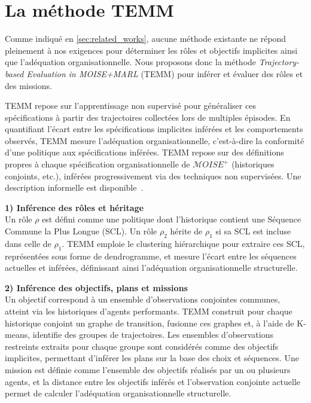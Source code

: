 \documentclass[dissemination]{jfsma}
\begin{document}
\section{La méthode TEMM}
\label{sec:TEMM_algorithm}

Comme indiqué en \autoref{sec:related_works}, aucune méthode existante ne répond pleinement à nos exigences pour déterminer les rôles et objectifs implicites ainsi que l'adéquation organisationnelle. Nous proposons donc la méthode \textit{Trajectory-based Evaluation in MOISE+MARL} (TEMM) pour inférer et évaluer des rôles et des missions.

TEMM repose sur l'apprentissage non supervisé pour généraliser ces spécifications à partir des trajectoires collectées lors de multiples épisodes. En quantifiant l'écart entre les spécifications implicites inférées et les comportements observés, TEMM mesure l'adéquation organisationnelle, c'est-à-dire la conformité d'une politique aux spécifications inférées. TEMM repose sur des définitions propres à chaque spécification organisationnelle de \(\mathcal{M}OISE^+\) (historiques conjoints, etc.), inférées progressivement via des techniques non supervisées. Une description informelle est disponible~\hyperref[fn:github]{\footnotemark[1]}.


\noindent\textbf{1) Inférence des rôles et héritage} \\
Un rôle \(\rho\) est défini comme une politique dont l'historique contient une Séquence Commune la Plus Longue (SCL). Un rôle \(\rho_2\) hérite de \(\rho_1\) si sa SCL est incluse dans celle de \(\rho_1\). TEMM emploie le clustering hiérarchique pour extraire ces SCL, représentées sous forme de dendrogramme, et mesure l'écart entre les séquences actuelles et inférées, définissant ainsi l'adéquation organisationnelle structurelle.

\noindent\textbf{2) Inférence des objectifs, plans et missions} \\
Un objectif correspond à un ensemble d'observations conjointes communes, atteint via les historiques d'agents performants. TEMM construit pour chaque historique conjoint un graphe de transition, fusionne ces graphes et, à l'aide de K-means, identifie des groupes de trajectoires. Les ensembles d'observations restreints extraits pour chaque groupe sont considérés comme des objectifs implicites, permettant d'inférer les plans sur la base des choix et séquences. Une mission est définie comme l'ensemble des objectifs réalisés par un ou plusieurs agents, et la distance entre les objectifs inférés et l'observation conjointe actuelle permet de calculer l'adéquation organisationnelle structurelle.
\end{document}
